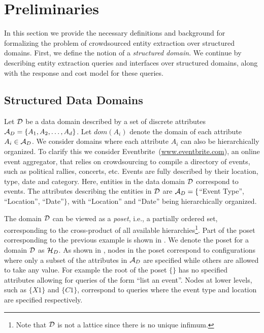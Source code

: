 
\section{Preliminaries}
\label{sec:prelims}
In this section we provide the necessary definitions and background for formalizing the problem of crowdsourced entity extraction over structured domains. First, we define the notion of a {\em structured domain}. We continue by describing entity extraction queries and interfaces over structured domains, along with the response and cost model for these queries. 

\subsection{Structured Data Domains}
\label{sec:data-domain}

Let $\mathcal{D}$ be a data domain described by a set of discrete attributes $\mathcal{A}_D = \{A_1, A_2, \dots, A_d\}$. Let $dom(A_i)$ denote the domain of each attribute $A_i  \in \mathcal{A}_D$. We consider domains where each attribute $A_i$ can also be hierarchically organized. To clarify this we consider Eventbrite~(\url{www.eventbrite.com}), an online event aggregator, that relies on crowdsourcing to compile a directory of events, such as political rallies, concerts, etc. Events are fully described by their location, type, date and category. Here, entities in the data domain $\mathcal{D}$ correspond to events. The attributes describing the entities in $\mathcal{D}$ are $\mathcal{A}_D = \{$``Event Type'', ``Location'', ``Date''$\}$, with ``Location'' and ``Date'' being hierarchically organized.

The domain $\mathcal{D}$ can be viewed as a {\em poset}, i.e., a partially ordered set, corresponding to the cross-product of all available hierarchies\footnote{Note that $\mathcal{D}$ is not a lattice since there is no unique infimum.}. Part of the poset corresponding to the previous example is shown in . We denote the poset for a domain $\mathcal{D}$ as $\mathcal{H}_D$. As shown in , nodes in the poset correspond to configurations where only a subset of the attributes in $\mathcal{A}_D$ are specified while others are allowed to take any value. For example the root of the poset $\{\}$ has no specified attributes allowing for queries of the form ``list an event''. Nodes at lower levels, such as $\{X1\}$ and $\{C1\}$, correspond to queries where the event type and location are specified respectively. 

